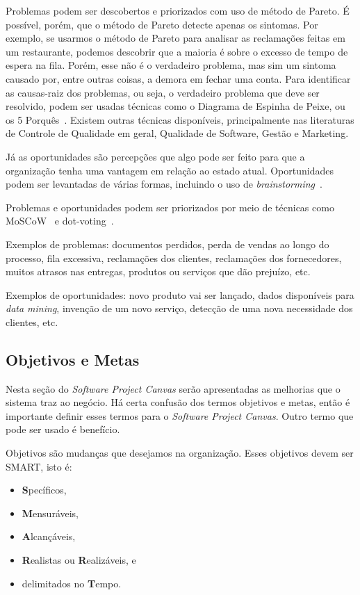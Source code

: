 \documentclass[fontsize=12pt, a4paper,pagesize=auto,toc=listof, ,twoside,chapterprefix=false,appendixprefix=true,open=right]{scrbook}
\begin{document}
Problemas podem ser descobertos e priorizados com uso de método de Pareto.
É possível, porém, que o método de Pareto detecte apenas os sintomas.
Por exemplo, se usarmos o método de Pareto para analisar as reclamações feitas em um restaurante, podemos descobrir que a maioria é sobre o excesso de tempo de espera na fila.
Porém, esse não é o verdadeiro problema, mas sim um sintoma causado por, entre outras coisas, a demora em fechar uma conta.
Para identificar as causas-raiz dos problemas, ou seja, o verdadeiro problema que deve ser resolvido, podem ser usadas técnicas como o Diagrama de Espinha de Peixe, ou os 5 Porquês~\citep{gray:2010}.
Existem outras técnicas disponíveis, principalmente nas literaturas de Controle de Qualidade em geral, Qualidade de Software, Gestão e Marketing.

Já as oportunidades são percepções que algo pode ser feito para que a organização tenha uma vantagem em relação ao estado atual.
Oportunidades podem ser levantadas de várias formas, incluindo o uso de \textit{brainstorming}~\citep{tracy:2015}.

Problemas e oportunidades podem ser priorizados por meio de técnicas como MoSCoW~\citep{dsdm:2nd} e dot-voting~\citep{gray:2010}.

Exemplos de problemas: documentos perdidos, perda de vendas ao longo do processo, fila excessiva, reclamações dos clientes, reclamações dos fornecedores, muitos atrasos nas entregas, produtos ou serviços que dão prejuízo, etc.

Exemplos de oportunidades: novo produto vai ser lançado, dados disponíveis para \textit{data mining}, invenção de um novo serviço, detecção de uma nova necessidade dos clientes, etc.


\subsection{Objetivos e Metas}

Nesta seção do \textit{Software Project Canvas} serão apresentadas as melhorias que o sistema traz ao negócio.
Há certa confusão dos termos objetivos e metas, então é importante definir esses termos para o \textit{Software Project Canvas}.
Outro termo que pode ser usado é benefício.

Objetivos são mudanças que desejamos na organização.
Esses objetivos devem ser SMART, isto é:
\begin{itemize}
\item \textbf{S}pecíficos,
\item \textbf{M}ensuráveis,
\item \textbf{A}lcançáveis,
\item \textbf{R}ealistas ou \textbf{R}ealizáveis, e
\item delimitados no \textbf{T}empo.
\end{itemize}
\end{document}
